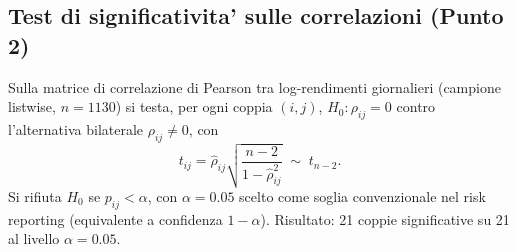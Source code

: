 
\subsection*{Test di significativita' sulle correlazioni (Punto 2)}
Sulla matrice di correlazione di Pearson tra log-rendimenti giornalieri (campione listwise,
$n=1130$) si testa, per ogni coppia $(i,j)$, $H_0:\rho_{ij}=0$ contro l'alternativa
bilaterale $\rho_{ij}\neq 0$, con
\[
  t_{ij}=\hat\rho_{ij}\sqrt{\frac{n-2}{1-\hat\rho_{ij}^2}}
  \;\sim\; t_{n-2}.
\]
Si rifiuta $H_0$ se $p_{ij}<\alpha$, con $\alpha=0.05$ scelto come
soglia convenzionale nel risk reporting (equivalente a confidenza $1-\alpha$).
Risultato: 21 coppie significative su 21 al livello $\alpha=0.05$.
